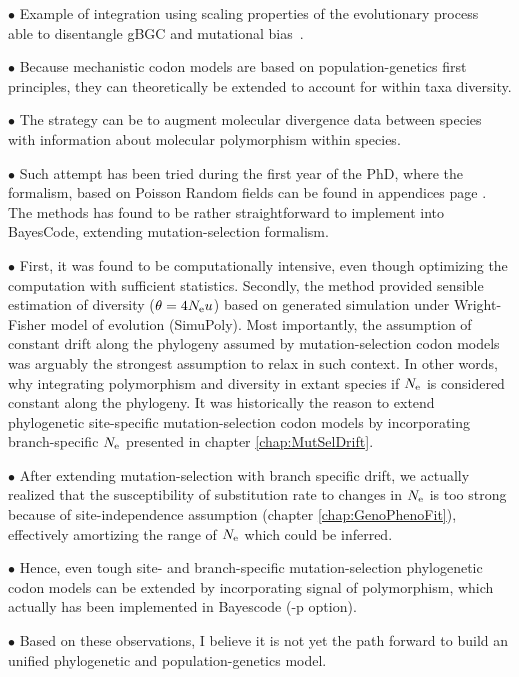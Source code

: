 $\bullet$ Example of integration using scaling properties of the evolutionary process~\citep{DeMaio2013, Schrempf2016, Bergman2018, Schrempf2019} able to disentangle gBGC and mutational bias~\citep{Borges2019, Borges2020}.

$\bullet$ Because mechanistic \gls{codon} models are based on population-genetics first principles, they can theoretically be extended to account for within taxa diversity.

$\bullet$ The strategy can be to augment molecular divergence data between species with information about molecular polymorphism within species.

$\bullet$ Such attempt has been tried during the first year of the PhD, where the formalism, based on Poisson Random fields can be found in appendices page \pageref{sec-appendix:PRF}.
The methods has found to be rather straightforward to implement into BayesCode, extending mutation-selection formalism.

$\bullet$ First, it was found to be computationally intensive, even though optimizing the computation with sufficient statistics.
Secondly, the method provided sensible estimation of diversity ($\theta = 4 N_{\textrm{e}} u$) based on generated simulation under Wright-Fisher model of evolution (SimuPoly).
Most importantly, the assumption of constant drift along the phylogeny assumed by mutation-selection \gls{codon} models was arguably the strongest assumption to relax in such context.
In other words, why integrating polymorphism and diversity in extant species if $N_{\textrm{e}}$ is considered constant along the phylogeny.
It was historically the reason to extend phylogenetic site-specific mutation-selection \gls{codon} models by incorporating branch-specific $N_{\textrm{e}}$ presented in chapter \ref{chap:MutSelDrift}.

$\bullet$ After extending mutation-selection with branch specific drift, we actually realized that the susceptibility of \gls{substitution} rate to changes in $N_{\textrm{e}}$ is too strong because of site-independence assumption (chapter \ref{chap:GenoPhenoFit}), effectively amortizing the range of $N_{\textrm{e}}$ which could be inferred.

$\bullet$ Hence, even tough site- and branch-specific mutation-selection phylogenetic \gls{codon} models can be extended by incorporating signal of polymorphism, which actually has been implemented in Bayescode (-p option).

$\bullet$ Based on these observations, I believe it is not yet the path forward to build an unified phylogenetic and population-genetics model.


